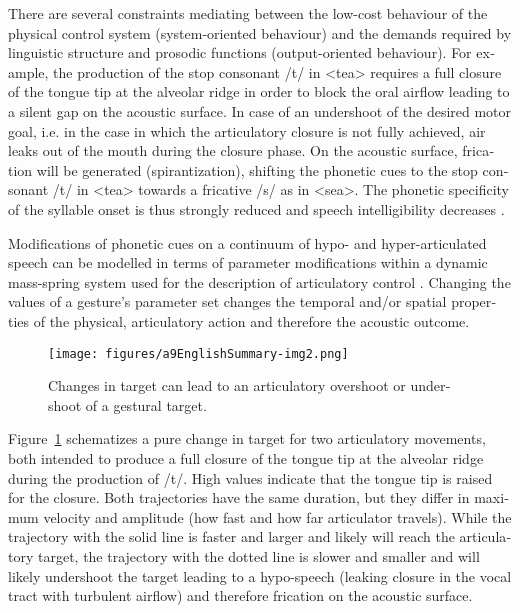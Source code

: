 \begin{otherlanguage}{english}
There are several constraints mediating between the low-cost behaviour of the physical control system (system-oriented behaviour) and the demands required by linguistic structure and prosodic functions (output-oriented behaviour). For example, the production of the stop consonant /t/ in <tea> requires a full closure of the tongue tip at the alveolar ridge in order to block the oral airflow leading to a silent gap on the acoustic surface. In case of an undershoot of the desired motor goal, i.e. in the case in which the articulatory closure is not fully achieved, air leaks out of the mouth during the closure phase. On the acoustic surface, frication will be generated (spirantization), shifting the phonetic cues to the stop consonant /t/ in <tea> towards a fricative /s/ as in <sea>. The phonetic specificity of the syllable onset is thus strongly reduced and speech intelligibility decreases \citep{Kent1999}.

Modifications of phonetic cues on a continuum of hypo- and hyper-articulated speech can be modelled in terms of parameter modifications within a dynamic mass-spring system used for the description of articulatory control \citep[see][]{Saltzman1986, Saltzman1987, Saltzman1989, Browman1989, Browman1992a}. Changing the values of a gesture’s parameter set changes the temporal and/or spatial properties of the physical, articulatory action and therefore the acoustic outcome. 


\begin{figure}[htbp]
		\texttt{[image: figures/a9EnglishSummary-img2.png]}		
		\caption{Changes in target can lead to an articulatory overshoot or undershoot of a gestural target.}
		\label{fig:0802}
\end{figure}

Figure~\ref{fig:0802} schematizes a pure change in target for two articulatory movements, both intended to produce a full closure of the tongue tip at the alveolar ridge during the production of /t/. High values indicate that the tongue tip is raised for the closure. Both trajectories have the same duration, but they differ in maximum velocity and amplitude (how fast and how far articulator travels). While the trajectory with the solid line is faster and larger and likely will reach the articulatory target, the trajectory with the dotted line is slower and smaller and will likely undershoot the target leading to a hypo-speech (leaking closure in the vocal tract with turbulent airflow) and therefore frication on the acoustic surface. 


\end{otherlanguage}
